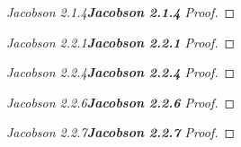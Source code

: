 \documentclass[12pt]{article}
\newenvironment{fproof}[1][]
  {\begin{proof}[\ifx\relax#1\relax\else\textbf{\large #1} Proof\fi]}
  {\end{proof}}
\begin{document}
\newpage

\begin{fproof}[Jacobson 2.1.4]
\end{fproof}

\newpage

\begin{fproof}[Jacobson 2.2.1]
\end{fproof}

\newpage

\begin{fproof}[Jacobson 2.2.4]
\end{fproof}

\newpage

\begin{fproof}[Jacobson 2.2.6]
\end{fproof}

\newpage

\begin{fproof}[Jacobson 2.2.7]
\end{fproof}
\end{document}
